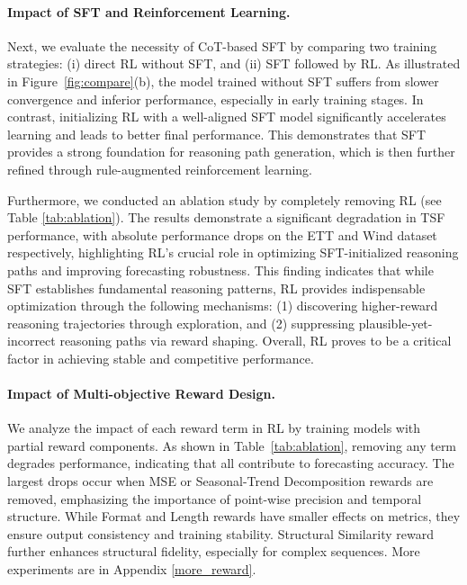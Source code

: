 


\paragraph{Impact of SFT and Reinforcement Learning.}

Next, we evaluate the necessity of CoT-based SFT by comparing two training strategies: (i) direct RL without SFT, and (ii) SFT followed by RL. As illustrated in Figure~\ref{fig:compare}(b), the model trained without SFT suffers from slower convergence and inferior performance, especially in early training stages. In contrast, initializing RL with a well-aligned SFT model significantly accelerates learning and leads to better final performance. This demonstrates that SFT provides a strong foundation for reasoning path generation, which is then further refined through rule-augmented reinforcement learning.

Furthermore, we conducted an ablation study by completely removing RL (see Table \ref{tab:ablation}). The results demonstrate a significant degradation in TSF performance, with absolute performance drops on the ETT and Wind dataset respectively, highlighting RL's crucial role in optimizing SFT-initialized reasoning paths and improving forecasting robustness. This finding indicates that while SFT establishes fundamental reasoning patterns, RL provides indispensable optimization through the following mechanisms: (1) discovering higher-reward reasoning trajectories through exploration, and (2) suppressing plausible-yet-incorrect reasoning paths via reward shaping. Overall, RL proves to be a critical factor in achieving stable and competitive performance.


% 

\paragraph{Impact of Multi-objective Reward Design.}

We analyze the impact of each reward term in RL by training models with partial reward components. As shown in Table~\ref{tab:ablation}, removing any term degrades performance, indicating that all contribute to forecasting accuracy. The largest drops occur when MSE or Seasonal-Trend Decomposition rewards are removed, emphasizing the importance of point-wise precision and temporal structure. While Format and Length rewards have smaller effects on metrics, they ensure output consistency and training stability. Structural Similarity reward further enhances structural fidelity, especially for complex sequences. More experiments are in Appendix \ref{more_reward}.


